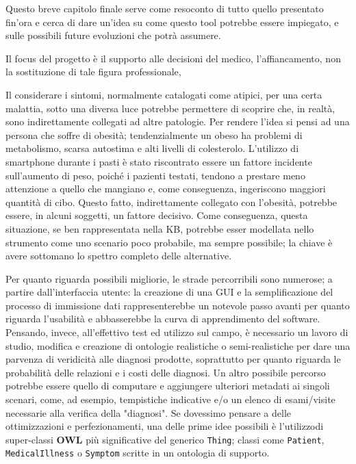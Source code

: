 Questo breve capitolo finale serve come resoconto di tutto quello
presentato fin’ora e cerca di dare un’idea su come questo tool 
potrebbe essere impiegato, e sulle possibili future evoluzioni che potrà assumere.

Il focus del progetto è il supporto alle decisioni del medico,  l'affiancamento, non la sostituzione di tale figura professionale,

Il considerare i sintomi, normalmente catalogati come atipici, per una certa malattia, 
sotto una diversa luce potrebbe permettere di scoprire che, in realtà, sono indirettamente collegati ad altre patologie.
Per rendere l’idea si pensi ad una persona che soffre di obesità; tendenzialmente 
un obeso ha problemi di metabolismo, scarsa autostima e alti livelli di colesterolo. 
L’utilizzo di smartphone durante i pasti è stato riscontrato essere un fattore incidente sull’aumento di peso, poiché i pazienti testati, tendono a prestare meno attenzione a quello che mangiano e, come conseguenza, ingeriscono maggiori quantità di cibo. 
Questo fatto, indirettamente collegato con l’obesità, potrebbe essere, in alcuni soggetti,
un fattore decisivo. Come conseguenza, questa situazione, se ben rappresentata nella KB, potrebbe esser modellata nello strumento come uno scenario poco probabile, ma sempre possibile; la chiave è avere sottomano lo spettro completo delle alternative.

Per quanto riguarda possibili migliorie, le strade percorribili sono numerose; a partire dall'interfaccia utente: la creazione di una GUI e la semplificazione del processo 
di immissione dati rappresenterebbe un notevole passo avanti per quanto riguarda l'usabilità
e abbasserebbe la curva di apprendimento del software.
Pensando, invece, all'effettivo test ed utilizzo sul campo, è necessario un lavoro di studio,
modifica e creazione di ontologie realistiche o semi-realistiche per dare una parvenza di 
veridicità alle diagnosi prodotte, soprattutto per quanto riguarda le probabilità delle
relazioni e i costi delle diagnosi.
Un altro  possibile percorso potrebbe essere quello di computare e aggiungere ulteriori metadati ai singoli scenari, come, ad esempio, tempistiche indicative e/o un elenco di esami/visite necessarie alla verifica della "diagnosi".
Se dovessimo pensare a delle ottimizzazioni e perfezionamenti, una delle prime idee possibili è l'utilizzodi super-classi \textbf{OWL} più significative del generico \texttt{Thing}; classi come
\texttt{Patient}, \texttt{MedicalIllness} o \texttt{Symptom} scritte in un ontologia di supporto.
